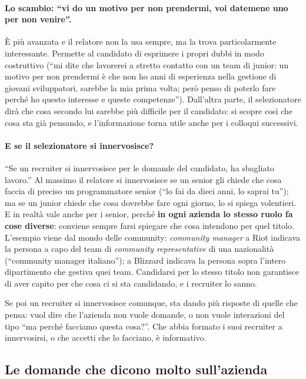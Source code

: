 \paragraph{Lo scambio: ``vi do un motivo per non prendermi, voi datemene uno
per non venire''.} È più avanzata e il relatore non la usa sempre, ma la trova
particolarmente interessante. Permette al candidato di esprimere i propri dubbi
in modo costruttivo (``mi dite che lavorerei a stretto contatto con un team di
junior: un motivo per non prendermi è che non ho anni di esperienza nella
gestione di giovani sviluppatori, sarebbe la mia prima volta; però penso di
poterlo fare perché ho questo interesse e queste competenze''). Dall'altra
parte, il selezionatore dirà che cosa secondo lui sarebbe più difficile per il
candidato: si scopre così che cosa sta già pensando, e l'informazione torna
utile anche per i colloqui successivi.

\paragraph{E se il selezionatore si innervosisce?} ``Se un recruiter si
innervosisce per le domande del candidato, ha sbagliato lavoro.'' Al massimo il
relatore si innervosisce se un senior gli chiede che cosa faccia di preciso un
programmatore senior (``lo fai da dieci anni, lo saprai tu''); ma se un junior
chiede che cosa dovrebbe fare ogni giorno, lo si spiega volentieri. E in realtà
vale anche per i senior, perché \textbf{in ogni azienda lo stesso ruolo fa cose
diverse}: conviene sempre farsi spiegare che cosa intendono per quel titolo.
L'esempio viene dal mondo delle community: \emph{community manager} a Riot
indicava la persona a capo del team di \emph{community representative} di una
nazionalità (``community manager italiano''); a Blizzard indicava la persona
sopra l'intero dipartimento che gestiva quei team. Candidarsi per lo stesso
titolo non garantisce di aver capito per che cosa ci si sta candidando, e i
recruiter lo sanno.

Se poi un recruiter si innervosisce comunque, sta dando più risposte di quelle
che pensa: vuol dire che l'azienda non vuole domande, o non vuole interazioni
del tipo ``ma perché facciamo questa cosa?''. Che abbia formato i suoi
recruiter a innervosirsi, o che accetti che lo facciano, è informativo.

\subsection{Le domande che dicono molto sull'azienda}

